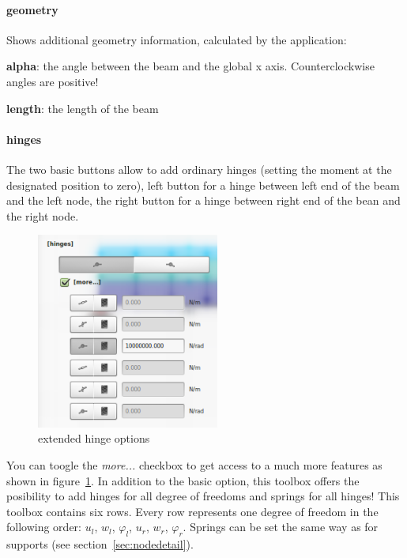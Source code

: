 \documentclass[a4paper,11pt]{report}
\begin{document}
\paragraph{geometry}
Shows additional geometry information, calculated by the application:
\begin{trivlist}
	\leftskip=1cm
	\item[]\textbf{alpha}: the angle between the beam and the global x axis. Counterclockwise angles are positive!
	\item[]\textbf{length}: the length of the beam
\end{trivlist}

\paragraph{hinges}
The two basic buttons allow to add ordinary hinges (setting the moment at the designated position to zero), left button for a hinge between left end of the beam and the left node, the right button for a hinge between right end of the bean and the right node.\\
\begin{minipage}[h]{6.5cm}
\begin{figure}[H]
\begin{center}
\includegraphics[width=6cm]{../pictures/hingesextended.png}
\caption{extended hinge options}
\label{pic:hingesextended}
\end{center}
\end{figure}
\end{minipage}
\begin{minipage}[h]{\textwidth-7cm}
You can toogle the \textit{more...} checkbox to get access to a much more features as shown in figure~\ref{pic:hingesextended}. In addition to the basic option, this toolbox offers the posibility to add hinges for all degree of freedoms and springs for all hinges! This toolbox contains six rows. Every row represents one degree of freedom in the following order: $u_l$, $w_l$, $\varphi_l$, $u_r$, $w_r$, $\varphi_r$. Springs can be set the same way as for supports (see section~\ref{sec:nodedetail}).
\end{minipage}
\end{document}
